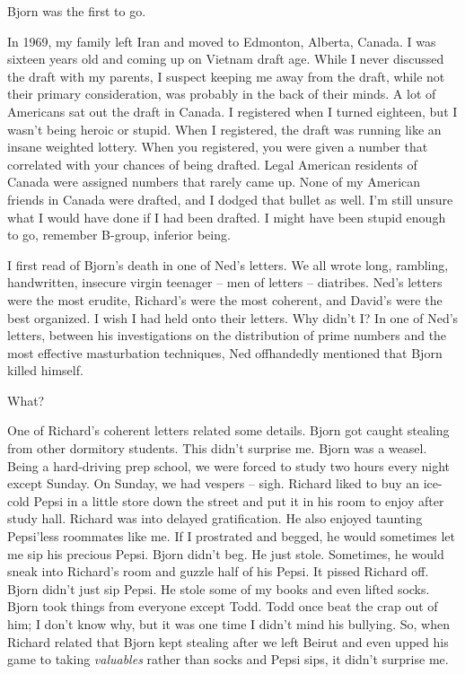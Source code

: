 Bjorn was the first to go.

In 1969, my family left Iran and moved to Edmonton, Alberta, Canada. I
was sixteen years old and coming up on Vietnam draft age. While I never
discussed the draft with my parents, I suspect keeping me away from the
draft, while not their primary consideration, was probably in the back
of their minds. A lot of Americans sat out the draft in Canada. I
registered when I turned eighteen, but I wasn't being heroic or stupid.
When I registered, the draft was running like an insane weighted
lottery. When you registered, you were given a number that correlated
with your chances of being drafted. Legal American residents of Canada
were assigned numbers that rarely came up. None of my American friends
in Canada were drafted, and I dodged that bullet as well. I'm still
unsure what I would have done if I had been drafted. I might have been
stupid enough to go, remember B-group, inferior being.

I first read of Bjorn's death in one of Ned's letters. We all wrote
long, rambling, handwritten, insecure virgin teenager -- men of letters
-- diatribes. Ned's letters were the most erudite, Richard's were the
most coherent, and David's were the best organized. I wish I had held
onto their letters. Why didn't I? In one of Ned's letters, between his
investigations on the distribution of prime numbers and the most
effective masturbation techniques, Ned offhandedly mentioned that Bjorn
killed himself.

What?

One of Richard's coherent letters related some details. Bjorn got caught
stealing from other dormitory students. This didn't surprise me. Bjorn
was a weasel. Being a hard-driving prep school, we were forced to study
two hours every night except Sunday. On Sunday, we had vespers -- sigh.
Richard liked to buy an ice-cold Pepsi in a little store down the street
and put it in his room to enjoy after study hall. Richard was into
delayed gratification. He also enjoyed taunting Pepsi'less roommates
like me. If I prostrated and begged, he would sometimes let me sip his
precious Pepsi. Bjorn didn't beg. He just stole. Sometimes, he would
sneak into Richard's room and guzzle half of his Pepsi. It pissed
Richard off. Bjorn didn't just sip Pepsi. He stole some of my books and
even lifted socks. Bjorn took things from everyone except Todd. Todd
once beat the crap out of him; I don't know why, but it was one time I
didn't mind his bullying. So, when Richard related that Bjorn kept
stealing after we left Beirut and even upped his game to taking
\emph{valuables} rather than socks and Pepsi sips, it didn't surprise
me.

